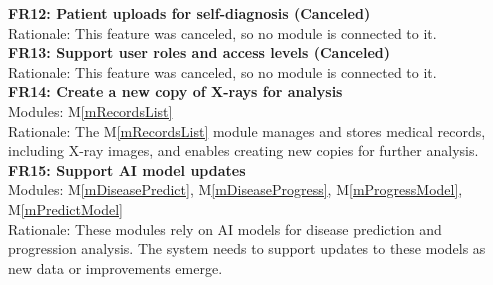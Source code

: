 \documentclass[12pt, titlepage]{article}
\newcommand{\mref}[1]{M\ref{#1}}
\begin{document}
\noindent\textbf{FR12: Patient uploads for self-diagnosis (Canceled)} \\
Rationale: This feature was canceled, so no module is connected to it. \\
\newline
\textbf{FR13: Support user roles and access levels (Canceled)} \\
Rationale: This feature was canceled, so no module is connected to it. \\

\noindent\textbf{FR14: Create a new copy of X-rays for analysis} \\
Modules: \mref{mRecordsList} \\
Rationale: The \mref{mRecordsList} module manages and stores medical records, including X-ray images, and enables creating new copies for further analysis. \\
\newline
\textbf{FR15: Support AI model updates} \\
Modules: \mref{mDiseasePredict}, \mref{mDiseaseProgress}, \mref{mProgressModel}, \mref{mPredictModel} \\
Rationale: These modules rely on AI models for disease prediction and progression analysis. The system needs to support updates to these models as new data or improvements emerge. \\
\newline
\end{document}

